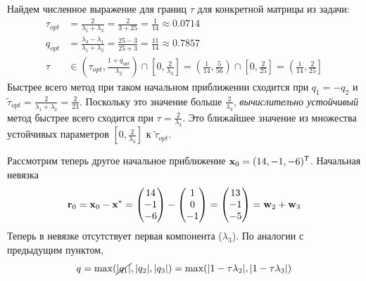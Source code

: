 \documentclass[professionalfonts,compress,unicode]{beamer}
\begin{document}
{
    Найдем численное выражение для границ $\tau$ для конкретной матрицы из
    задачи:
    \begin{align*}
        \tau_{opt} &= \frac{2}{\lambda_1 + \lambda_3} = \frac{2}{3+25} =
            \frac{1}{14} \approx 0.0714\\
        q_{opt} &= \frac{\lambda_3 - \lambda_1}{\lambda_1 + \lambda_3} =
            \frac{25-3}{25+3} = \frac{11}{14} \approx 0.7857\\
        \tau &\in 
            \left(\tau_{opt}, \frac{1+q_{opt}}{\lambda_2}\right) \cap
            \left[0, \frac{2}{\lambda_3}\right] =
            \left(\frac{1}{14}, \frac{5}{56}\right) \cap
            \left[0, \frac{2}{25}\right] =
            \left(\frac{1}{14}, \frac{2}{25}\right]
    \end{align*}
    Быстрее всего метод при таком начальном приближении 
    сходится при $q_1 = -q_2$ и 
    $\tilde{\tau}_{opt} = \frac{2}{\lambda_1 + \lambda_2} = \frac{2}{23}$. 
    Поскольку это значение больше $\frac{2}{\lambda_3}$, 
    \emph{вычислительно устойчивый} метод
    быстрее всего сходится при $\tau = \frac{2}{\lambda_3}$. Это
    ближайшее значение из множества устойчивых параметров
    $\left[0,\frac{2}{\lambda_3}\right]$ к 
    $\tilde{\tau}_{opt}$.
}

{
    Рассмотрим теперь другое начальное приближение 
    ${\bf x}_0 = (14, -1, -6)^\mathsf{T}$. Начальная невязка
    \begin{equation*}
        {\bf r}_0 = {\bf x}_0 - {\bf x}^* = 
        \begin{pmatrix}
            14 \\ -1 \\ -6
        \end{pmatrix} -
        \begin{pmatrix}
            1 \\ 0 \\ -1
        \end{pmatrix} =
        \begin{pmatrix}
            13 \\ -1 \\ -5
        \end{pmatrix} = 
        {\bf w}_2 + {\bf w}_3
    \end{equation*}
    Теперь в невязке отсутствует первая компонента ($\lambda_3$). По аналогии 
    с предыдущим пунктом,
    \begin{equation*}
        q = \max(\cancel{|q_1|}, |q_2|, |q_3|) = 
            \max(|1-\tau \lambda_2|, |1 -\tau \lambda_3|)
    \end{equation*}
}
\end{document}
